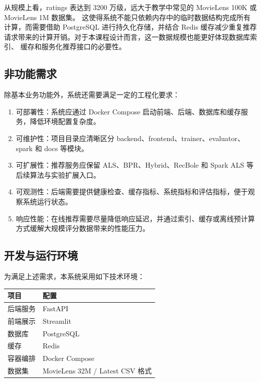 从规模上看，ratings 表达到 3200 万级，远大于教学中常见的 MovieLens 100K 或 MovieLens 1M 数据集。
这使得系统不能只依赖内存中的临时数据结构完成所有计算，而需要借助 PostgreSQL 进行持久化存储，并结合
Redis 缓存减少重复推荐请求带来的计算开销。对于本课程设计而言，这一数据规模也能更好体现数据库索引、
缓存和服务化推荐接口的必要性。

\subsection{非功能需求}

除基本业务功能外，系统还需要满足一定的工程化要求：

\begin{enumerate}[leftmargin=2em]
  \item 可部署性：系统应通过 Docker Compose 启动前端、后端、数据库和缓存服务，降低环境配置复杂度。
  \item 可维护性：项目目录应清晰区分 backend、frontend、trainer、evaluator、spark 和 docs 等模块。
  \item 可扩展性：推荐服务应保留 ALS、BPR、Hybrid、RecBole 和 Spark ALS 等后续算法与实验扩展入口。
  \item 可观测性：后端需要提供健康检查、缓存指标、系统指标和评估指标，便于观察系统运行状态。
  \item 响应性能：在线推荐需要尽量降低响应延迟，并通过索引、缓存或离线预计算方式缓解大规模评分数据带来的性能压力。
\end{enumerate}

\subsection{开发与运行环境}

为满足上述需求，本系统采用如下技术环境：

\begin{center}
\begin{tabular}{ll}
\toprule
\textbf{项目} & \textbf{配置} \\
\midrule
后端服务 & FastAPI \\
前端展示 & Streamlit \\
数据库 & PostgreSQL \\
缓存 & Redis \\
容器编排 & Docker Compose \\
数据集 & MovieLens 32M / Latest CSV 格式 \\
\bottomrule
\end{tabular}
\end{center}

\newpage
